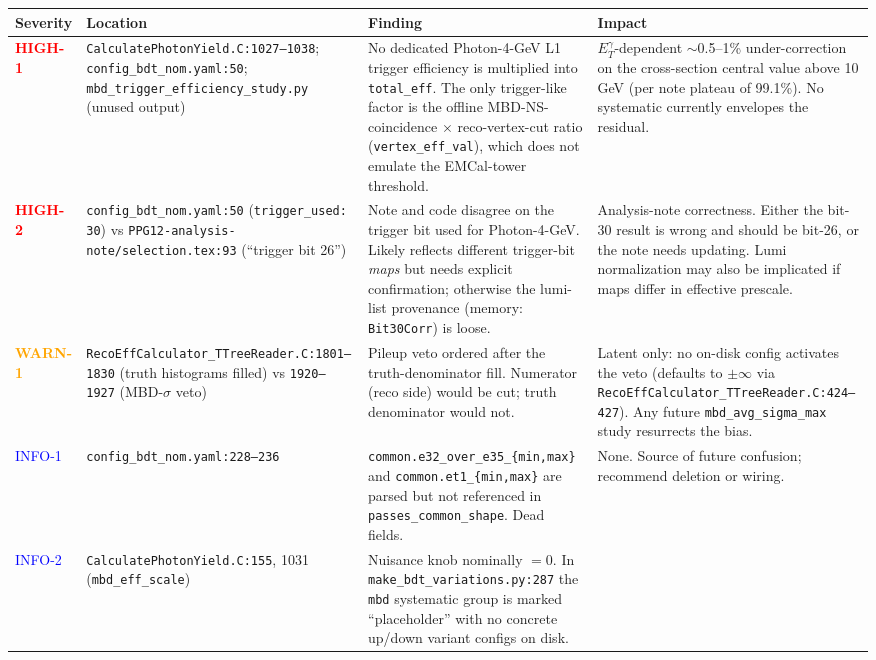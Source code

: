 \documentclass[11pt,a4paper]{article}
\newcommand{\etg}{$E_T^\gamma$}
\newcommand{\crit}[1]{\textcolor{red}{\textbf{#1}}}
\newcommand{\warn}[1]{\textcolor{orange}{\textbf{#1}}}
\newcommand{\info}[1]{\textcolor{blue}{#1}}
\begin{document}
\begin{longtable}{@{}p{1.9cm}p{4.8cm}p{5.8cm}p{4.3cm}@{}}
\toprule
Severity & Location & Finding & Impact \\
\midrule
\crit{HIGH-1} &
\texttt{CalculatePhotonYield.C:1027--1038};
\texttt{config\_bdt\_nom.yaml:50};
\texttt{mbd\_trigger\_efficiency\_study.py} (unused output) &
No dedicated Photon-4-GeV L1 trigger efficiency is multiplied into
\texttt{total\_eff}. The only trigger-like factor is the offline
MBD-NS-coincidence $\times$ reco-vertex-cut ratio
(\texttt{vertex\_eff\_val}), which does not emulate the EMCal-tower
threshold. &
\etg-dependent $\sim$0.5--1\% under-correction on the cross-section
central value above 10\,GeV (per note plateau of 99.1\%). No
systematic currently envelopes the residual. \\
\addlinespace
\crit{HIGH-2} &
\texttt{config\_bdt\_nom.yaml:50} (\texttt{trigger\_used: 30}) vs
\texttt{PPG12-analysis-note/selection.tex:93} (``trigger bit 26'') &
Note and code disagree on the trigger bit used for Photon-4-GeV. Likely
reflects different trigger-bit \emph{maps} but needs explicit
confirmation; otherwise the lumi-list provenance (memory:
\texttt{Bit30Corr}) is loose. &
Analysis-note correctness. Either the bit-30 result is wrong and should
be bit-26, or the note needs updating. Lumi normalization may also be
implicated if maps differ in effective prescale. \\
\addlinespace
\warn{WARN-1} &
\texttt{RecoEffCalculator\_TTreeReader.C:1801--1830} (truth
histograms filled) vs \texttt{1920--1927} (MBD-$\sigma$ veto) &
Pileup veto ordered after the truth-denominator fill. Numerator
(reco side) would be cut; truth denominator would not. &
Latent only: no on-disk config activates the veto
(defaults to $\pm\infty$ via
\texttt{RecoEffCalculator\_TTreeReader.C:424--427}). Any future
\texttt{mbd\_avg\_sigma\_max} study resurrects the bias. \\
\addlinespace
\info{INFO-1} &
\texttt{config\_bdt\_nom.yaml:228--236} &
\texttt{common.e32\_over\_e35\_\{min,max\}} and
\texttt{common.et1\_\{min,max\}} are parsed but not referenced in
\texttt{passes\_common\_shape}. Dead fields. &
None. Source of future confusion; recommend deletion or wiring. \\
\addlinespace
\info{INFO-2} &
\texttt{CalculatePhotonYield.C:155}, 1031 (\texttt{mbd\_eff\_scale}) &
Nuisance knob nominally $=0$. In \texttt{make\_bdt\_variations.py:287}
the \texttt{mbd} systematic group is marked ``placeholder'' with no
concrete up/down variant configs on disk. &

\end{longtable}
\end{document}
